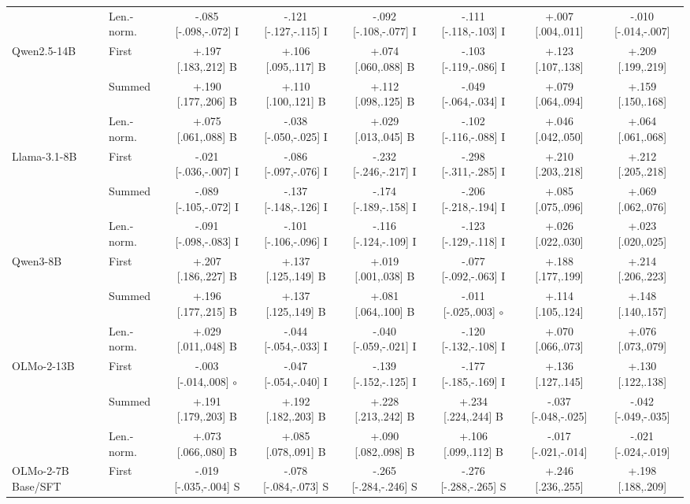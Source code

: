 \begin{table}[t]
\begin{tabular}{@{}llcccccc@{}}
 & Len.-norm. & -.085 [-.098,-.072] I & -.121 [-.127,-.115] I & -.092 [-.108,-.077] I & -.111 [-.118,-.103] I & +.007 [.004,.011] & -.010 [-.014,-.007] \\
\addlinespace[1pt]
Qwen2.5-14B & First & +.197 [.183,.212] B & +.106 [.095,.117] B & +.074 [.060,.088] B & -.103 [-.119,-.086] I & +.123 [.107,.138] & +.209 [.199,.219] \\
 & Summed & +.190 [.177,.206] B & +.110 [.100,.121] B & +.112 [.098,.125] B & -.049 [-.064,-.034] I & +.079 [.064,.094] & +.159 [.150,.168] \\
 & Len.-norm. & +.075 [.061,.088] B & -.038 [-.050,-.025] I & +.029 [.013,.045] B & -.102 [-.116,-.088] I & +.046 [.042,.050] & +.064 [.061,.068] \\
\addlinespace[1pt]
Llama-3.1-8B & First & -.021 [-.036,-.007] I & -.086 [-.097,-.076] I & -.232 [-.246,-.217] I & -.298 [-.311,-.285] I & +.210 [.203,.218] & +.212 [.205,.218] \\
 & Summed & -.089 [-.105,-.072] I & -.137 [-.148,-.126] I & -.174 [-.189,-.158] I & -.206 [-.218,-.194] I & +.085 [.075,.096] & +.069 [.062,.076] \\
 & Len.-norm. & -.091 [-.098,-.083] I & -.101 [-.106,-.096] I & -.116 [-.124,-.109] I & -.123 [-.129,-.118] I & +.026 [.022,.030] & +.023 [.020,.025] \\
\addlinespace[1pt]
Qwen3-8B & First & +.207 [.186,.227] B & +.137 [.125,.149] B & +.019 [.001,.038] B & -.077 [-.092,-.063] I & +.188 [.177,.199] & +.214 [.206,.223] \\
 & Summed & +.196 [.177,.215] B & +.137 [.125,.149] B & +.081 [.064,.100] B & -.011 [-.025,.003] $\circ$ & +.114 [.105,.124] & +.148 [.140,.157] \\
 & Len.-norm. & +.029 [.011,.048] B & -.044 [-.054,-.033] I & -.040 [-.059,-.021] I & -.120 [-.132,-.108] I & +.070 [.066,.073] & +.076 [.073,.079] \\
\addlinespace[1pt]
OLMo-2-13B & First & -.003 [-.014,.008] $\circ$ & -.047 [-.054,-.040] I & -.139 [-.152,-.125] I & -.177 [-.185,-.169] I & +.136 [.127,.145] & +.130 [.122,.138] \\
 & Summed & +.191 [.179,.203] B & +.192 [.182,.203] B & +.228 [.213,.242] B & +.234 [.224,.244] B & -.037 [-.048,-.025] & -.042 [-.049,-.035] \\
 & Len.-norm. & +.073 [.066,.080] B & +.085 [.078,.091] B & +.090 [.082,.098] B & +.106 [.099,.112] B & -.017 [-.021,-.014] & -.021 [-.024,-.019] \\
\addlinespace[1pt]
OLMo-2-7B Base/SFT & First & -.019 [-.035,-.004] S & -.078 [-.084,-.073] S & -.265 [-.284,-.246] S & -.276 [-.288,-.265] S & +.246 [.236,.255] & +.198 [.188,.209] \\

\end{tabular}
\end{table}
